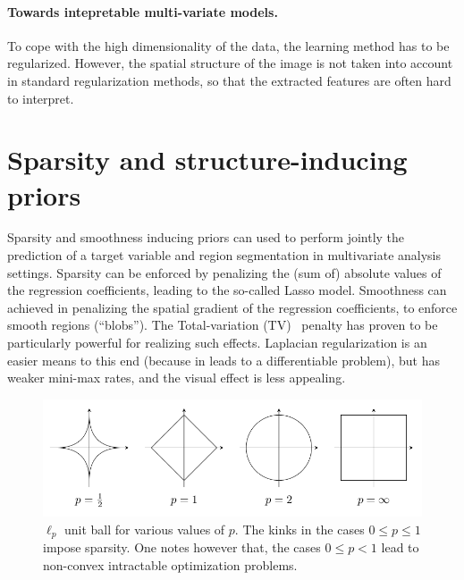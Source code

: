 \paragraph{Towards intepretable multi-variate models.}
To cope with the high dimensionality of the data, the learning method has to be
regularized. However, the spatial structure of the image is not
taken into account in standard regularization methods, so that the
extracted features are often hard to interpret.

\section{Sparsity and structure-inducing priors}
Sparsity and smoothness inducing priors can used to
perform jointly the prediction of a target variable and region
segmentation in multivariate analysis settings. Sparsity can be enforced by
penalizing the (sum of) absolute values of the regression coefficients, leading to the
so-called Lasso model. Smoothness can achieved in penalizing the spatial gradient of
the regression coefficients, to enforce smooth regions (``blobs'').
The Total-variation (TV)~\citep{rudin1992nonlinear} penalty has
proven to be particularly powerful for realizing such effects. Laplacian regularization
is an easier means to this end (because in leads to a differentiable problem),
but has weaker mini-max rates, and the visual effect is less appealing.

\begin{figure}[!htbp]
  \includegraphics[width=1\linewidth]{figures/balls.png}
  \caption{$\ell_p$ unit ball for various values of $p$. The kinks
    in the cases $0 \le p \le 1$ impose sparsity. One notes however that, the
  cases $0 \le p < 1$ lead to non-convex intractable optimization problems.}
\end{figure}

